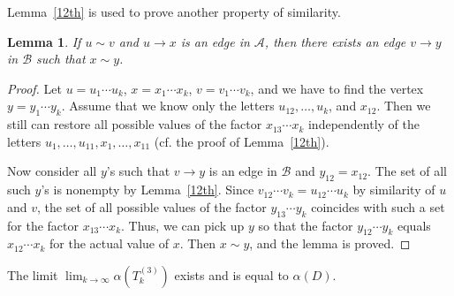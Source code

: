 \documentclass[submission,copyright]{eptcs}\providecommand{\event}{WORDS 2011}
\newtheorem {Lemma} {Lemma}
\def\A{{\mathcal A}}
\def\B{{\mathcal B}}
\begin{document}
Lemma~\ref{12th} is used to prove another property of similarity.

\begin{Lemma}\label{sim2} 
If $u\sim v$ and $u\to x$ is an edge in $\A$, then there exists an edge $v\to y$ in $\B$ such that $x\sim y$.
\end{Lemma}

\begin{proof} 
Let $u=u_1\cdots u_k$, $x=x_1\cdots x_k$, $v=v_1\cdots v_k$, and we have to find the vertex $y=y_1\cdots y_k$. Assume that we know only the letters $u_{12},\ldots,u_k$, and $x_{12}$. Then we still can restore all possible values of the factor $x_{13}\cdots x_k$ independently of the letters $u_1,\ldots,u_{11},x_1,\ldots,x_{11}$ (cf. the proof of Lemma~\ref{12th}). 

Now consider all $y$'s such that $v\to y$ is an edge in $\B$ and $y_{12}=x_{12}$. The set of all such $y$'s is nonempty by Lemma~\ref{12th}. Since $v_{12}\cdots v_k=u_{12}\cdots u_k$ by similarity of $u$ and $v$, the set of all possible values of the factor $y_{13}\cdots y_k$ coincides with such a set for the factor $x_{13}\cdots x_k$. Thus, we can pick up $y$ so that the factor $y_{12}\cdots y_k$ equals $x_{12}\cdots x_k$ for the actual value of $x$. Then $x\sim y$, and the lemma is proved.
\end{proof}

\begin{teo} 
The limit $\lim_{k\to\infty}\alpha(T_k^{(3)})$ exists and is equal to $\alpha(D)$.
\end{teo}
\end{document}
